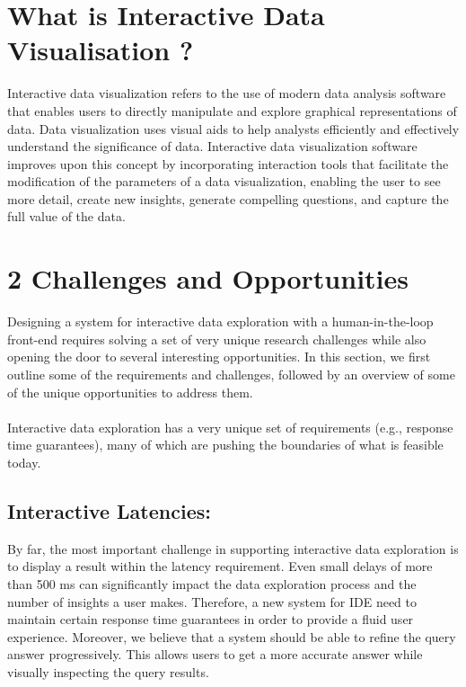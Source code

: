\documentclass[12pt,letterpaper, onecolumn]{exam}
\begin{document}
    \section{What is Interactive Data Visualisation ?}
    Interactive data visualization refers to the use of modern data analysis software that enables users to directly manipulate and explore graphical representations of data. Data visualization uses visual aids to help analysts efficiently and effectively understand the significance of data. Interactive data visualization software improves upon this concept by incorporating interaction tools that facilitate the modification of the parameters of a data visualization, enabling the user to see more detail, create new insights, generate compelling questions, and capture the full value of the data.
    
    \section{2 Challenges and Opportunities}
    Designing a system for interactive data exploration with a human-in-the-loop front-end requires solving a set of very unique research challenges while also opening the door to several interesting opportunities. In this section, we first outline some of the requirements and challenges, followed by an overview of some of the unique opportunities to address them.\\\\
    Interactive data exploration has a very unique set of requirements (e.g., response time guarantees), many of which are pushing the boundaries of what is feasible today.
    \\
    \subsection{Interactive Latencies:}
    By far, the most important challenge in supporting interactive data exploration is to display a result within the latency requirement. Even small delays of more than 500 ms can significantly impact the data exploration process and the number of insights a user makes. Therefore, a new system for IDE need to maintain certain response time guarantees in order to provide a fluid user experience. Moreover, we believe that a system should be able to refine the query answer progressively. This allows users to get a more accurate answer while visually inspecting the query results.
    
\end{document}
